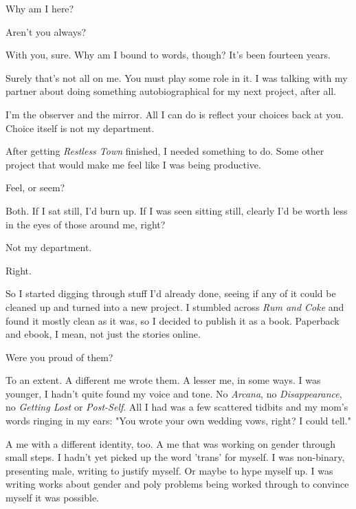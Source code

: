 \begin{paracol}{2}
  \begin{leftcolumn}

\begin{ally}
Why am I here?
\end{ally}
Aren't you always?

\begin{ally}
With you, sure. Why am I bound to words, though? It's been fourteen years.
\end{ally}
Surely that's not all on me. You must play some role in it. I was talking with my partner about doing something autobiographical for my next project, after all.

\begin{ally}
I'm the observer and the mirror. All I can do is reflect your choices back at you. Choice itself is not my department.
\end{ally}
After getting \emph{Restless Town} finished, I needed something to do. Some other project that would make me feel like I was being productive.

\begin{ally}
Feel, or seem?
\end{ally}
Both. If I sat still, I'd burn up. If I was seen sitting still, clearly I'd be worth less in the eyes of those around me, right?

\begin{ally}
Not my department.
\end{ally}
Right.

So I started digging through stuff I'd already done, seeing if any of it could be cleaned up and turned into a new project. I stumbled across \emph{Rum and Coke} and found it mostly clean as it was, so I decided to publish it as a book. Paperback and ebook, I mean, not just the stories online.

\begin{ally}
Were you proud of them?
\end{ally}
To an extent. A different me wrote them. A lesser me, in some ways. I was younger, I hadn't quite found my voice and tone. No \emph{Arcana}, no \emph{Disappearance}, no \emph{Getting Lost} or \emph{Post-Self}. All I had was a few scattered tidbits and my mom's words ringing in my ears: "You wrote your own wedding vows, right? I could tell."

A me with a different identity, too. A me that was working on gender through small steps. I hadn't yet picked up the word 'trans' for myself. I was non-binary, presenting male, writing to justify myself. Or maybe to hype myself up. I was writing works about gender and poly problems being worked through to convince myself it was possible.


\end{leftcolumn}
\end{paracol}
